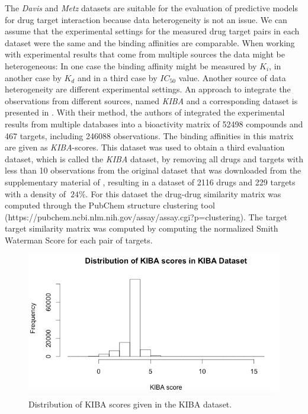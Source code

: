 The \textit{Davis} and \textit{Metz} datasets are suitable for the evaluation of predictive models for drug target interaction because data heterogeneity is not an issue. We can assume that the experimental settings for the measured drug target pairs in each dataset were the same and the binding affinities are comparable. When working with experimental results that come from multiple sources the data might be heterogeneous: In one case the binding affinity might be measured by $K_i$, in another case by $K_d$ and in a third case by $IC_{50}$ value. Another source of data heterogeneity are different experimental settings. An approach to integrate the observations from different sources, named \textit{KIBA} and a corresponding dataset is presented in \cite{tang2014making}. With their method, the authors of \cite{tang2014making} integrated the experimental results from multiple databases into a bioactivity matrix of 52498 compounds and 467 targets, including 246088 observations. The binding affinities in this matrix are given as \textit{KIBA}-scores. This dataset was used to obtain a third evaluation dataset, which is called the \textit{KIBA} dataset, by removing all drugs and targets with less than 10 observations from the original dataset that was downloaded from the supplementary material of \cite{tang2014making}, resulting in a dataset of 2116 drugs and 229 targets with a density of $~24\%$. For this dataset the drug-drug similarity matrix was computed through the PubChem structure clustering tool (https://pubchem.ncbi.nlm.nih.gov/assay/assay.cgi?p=clustering). The target target similarity matrix was computed by computing the normalized Smith Waterman Score \cite{yamanishi2010drug} for each pair of targets.

\begin{figure}
\begin{center}
\includegraphics[scale=0.6]{kiba_dist.png}
\end{center}
\caption{Distribution of KIBA scores given in the KIBA dataset.}
\end{figure}
